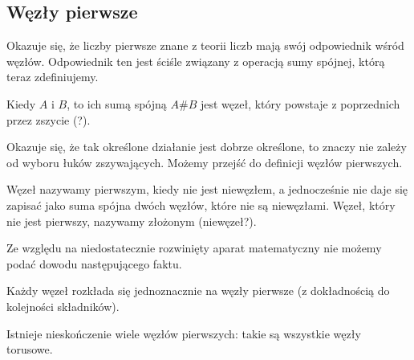 \subsection{Węzły pierwsze}

Okazuje się, że liczby pierwsze znane z teorii liczb mają swój odpowiednik wśród węzłów.
Odpowiednik ten jest ściśle związany z operacją sumy spójnej, którą teraz zdefiniujemy.

\begin{definicja}
Kiedy $A$ i $B$, to ich sumą spójną $A \# B$ jest węzeł, który powstaje z poprzednich przez zszycie (?).
\end{definicja}

Okazuje się, że tak określone działanie jest dobrze określone, to znaczy nie zależy od wyboru łuków zszywających.
Możemy przejść do definicji węzłów pierwszych.

\begin{definicja}
Węzeł nazywamy pierwszym, kiedy nie jest niewęzłem, a jednocześnie nie daje się zapisać jako suma spójna dwóch węzłów, które nie są niewęzłami.
Węzeł, który nie jest pierwszy, nazywamy złożonym (niewęzeł?).
\end{definicja}

Ze względu na niedostatecznie rozwinięty aparat matematyczny nie możemy podać dowodu następującego faktu.

\begin{twierdzenie}[Schubert, 1949]
Każdy węzeł rozkłada się jednoznacznie na węzły pierwsze (z dokładnością do kolejności składników).
\end{twierdzenie}

Istnieje nieskończenie wiele węzłów pierwszych: takie są wszystkie węzły torusowe.